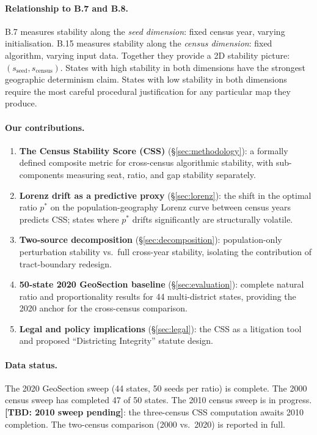 \paragraph{Relationship to B.7 and B.8.}
B.7 measures stability along the \emph{seed dimension}: fixed census year,
varying initialisation.
B.15 measures stability along the \emph{census dimension}: fixed algorithm,
varying input data.
Together they provide a 2D stability picture:
$(s_\text{seed}, s_\text{census})$.
States with high stability in both dimensions have the strongest geographic
determinism claim.
States with low stability in both dimensions require the most careful
procedural justification for any particular map they produce.

\paragraph{Our contributions.}
\begin{enumerate}
\item \textbf{The Census Stability Score (CSS)} (\S\ref{sec:methodology}):
  a formally defined composite metric for cross-census algorithmic stability,
  with sub-components measuring seat, ratio, and gap stability separately.

\item \textbf{Lorenz drift as a predictive proxy} (\S\ref{sec:lorenz}):
  the shift in the optimal ratio $p^*$ on the population-geography Lorenz
  curve between census years predicts CSS; states where $p^*$ drifts
  significantly are structurally volatile.

\item \textbf{Two-source decomposition} (\S\ref{sec:decomposition}):
  population-only perturbation stability vs.\ full cross-year stability,
  isolating the contribution of tract-boundary redesign.

\item \textbf{50-state 2020 GeoSection baseline} (\S\ref{sec:evaluation}):
  complete natural ratio and proportionality results for 44 multi-district
  states, providing the 2020 anchor for the cross-census comparison.

\item \textbf{Legal and policy implications} (\S\ref{sec:legal}):
  the CSS as a litigation tool and proposed ``Districting Integrity'' statute
  design.
\end{enumerate}

\paragraph{Data status.}
The 2020 GeoSection sweep (44 states, 50 seeds per ratio) is complete.
The 2000 census sweep has completed 47 of 50 states.
The 2010 census sweep is in progress.
\textbf{[TBD: 2010 sweep pending]}: the three-census CSS computation awaits
2010 completion.
The two-census comparison (2000 vs.\ 2020) is reported in full.

